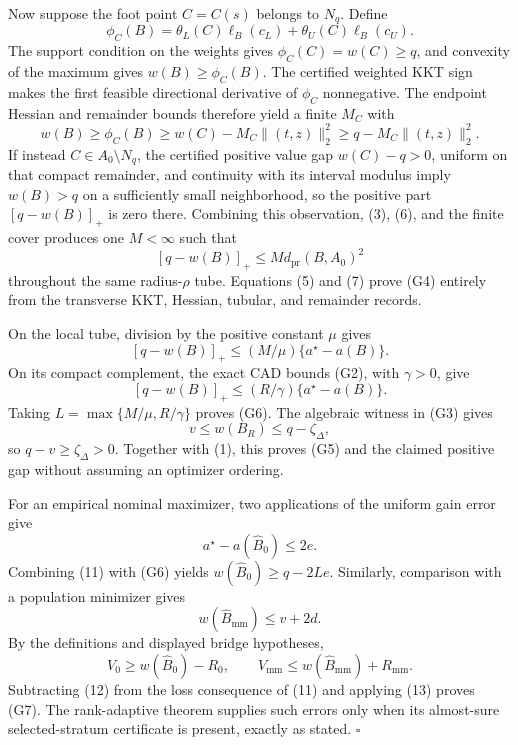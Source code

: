 Now suppose the foot point \(C=C(s)\) belongs to \(N_q\).  Define
\[
\phi_C(B)=\theta_L(C)\ell_B(c_L)+\theta_U(C)\ell_B(c_U).
\]
The support condition on the weights gives \(\phi_C(C)=w(C)\ge q\), and convexity of the maximum gives \(w(B)\ge\phi_C(B)\).  The certified weighted KKT sign makes the first feasible directional derivative of \(\phi_C\) nonnegative.  The endpoint Hessian and remainder bounds therefore yield a finite \(M_C\) with
\[
w(B)\ge\phi_C(B)
\ge w(C)-M_C\lVert(t,z)\rVert_2^2
\ge q-M_C\lVert(t,z)\rVert_2^2.
\tag{6}
\]
If instead \(C\in A_0\setminus N_q\), the certified positive value gap \(w(C)-q>0\), uniform on that compact remainder, and continuity with its interval modulus imply \(w(B)>q\) on a sufficiently small neighborhood, so the positive part \([q-w(B)]_+\) is zero there.  Combining this observation, (3), (6), and the finite cover produces one \(M<\infty\) such that
\[
[q-w(B)]_+\le M d_{\mathrm{pr}}(B,A_0)^2
\tag{7}
\]
throughout the same radius-\(\rho\) tube.  Equations (5) and (7) prove (G4) entirely from the transverse KKT, Hessian, tubular, and remainder records.

On the local tube, division by the positive constant \(\mu\) gives
\[
[q-w(B)]_+\le(M/\mu)\{a^\star-a(B)\}.
\tag{8}
\]
On its compact complement, the exact CAD bounds (G2), with \(\gamma>0\), give
\[
[q-w(B)]_+\le(R/\gamma)\{a^\star-a(B)\}.
\tag{9}
\]
Taking \(L=\max\{M/\mu,R/\gamma\}\) proves (G6).  The algebraic witness in (G3) gives
\[
v\le w(B_R)\le q-\zeta_\Delta,
\tag{10}
\]
so \(q-v\ge\zeta_\Delta>0\).  Together with (1), this proves (G5) and the claimed positive gap without assuming an optimizer ordering.

For an empirical nominal maximizer, two applications of the uniform gain error give
\[
a^\star-a(\widehat B_0)\le2e.
\tag{11}
\]
Combining (11) with (G6) yields \(w(\widehat B_0)\ge q-2Le\).  Similarly, comparison with a population minimizer gives
\[
w(\widehat B_{\mathrm{mm}})\le v+2d.
\tag{12}
\]
By the definitions and displayed bridge hypotheses,
\[
V_0\ge w(\widehat B_0)-R_0,
\qquad
V_{\mathrm{mm}}\le w(\widehat B_{\mathrm{mm}})+R_{\mathrm{mm}}.
\tag{13}
\]
Subtracting (12) from the loss consequence of (11) and applying (13) proves (G7).  The rank-adaptive theorem supplies such errors only when its almost-sure selected-stratum certificate is present, exactly as stated. \(\square\)